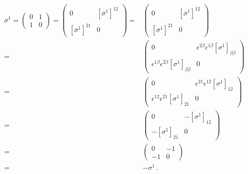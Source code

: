 \begin{align*}
  \overline{\sigma}^{1}=
  \begin{pmatrix}
   0 & 1\\
   1 & 0 
  \end{pmatrix}=
  \begin{pmatrix}
   0                                         &\left[\overline{\sigma}^1 \right]^{\dot{1}2}\\
 \left[\overline{\sigma}^1 \right]^{\dot{2}1}&0
  \end{pmatrix}=&
  \begin{pmatrix}
   0                                         &\left[\overline{\sigma}^1 \right]^{\dot{1}2}\\
 \left[\overline{\sigma}^1 \right]^{\dot{2}1}&0
  \end{pmatrix}\nonumber\\
=&\begin{pmatrix}
   0                                         &\epsilon^{2\beta}\epsilon^{\dot{1}\dot{\beta}}\left[\sigma^1 \right]_{\beta\dot{\beta}}\\
\epsilon^{1\beta}\epsilon^{\dot{2}\dot{\beta}} \left[\sigma^1 \right]_{\beta\dot{\beta}}&0
  \end{pmatrix}\nonumber\\
=&\begin{pmatrix}
   0                                         &\epsilon^{21}\epsilon^{\dot{1}\dot{2}}\left[\sigma^1 \right]_{1\dot{2}}\\
\epsilon^{12}\epsilon^{\dot{2}\dot{1}} \left[\sigma^1 \right]_{2\dot{1}}&0
  \end{pmatrix}\nonumber\\
=&\begin{pmatrix}
   0                                         &-\left[\sigma^1 \right]_{1\dot{2}}\\
-\left[\sigma^1 \right]_{2\dot{1}}&0
  \end{pmatrix}\nonumber\\
=&\begin{pmatrix}
   0                                         &-1\\
-1&0
  \end{pmatrix}\nonumber\\
=&-\sigma^1\,.
\end{align*}


